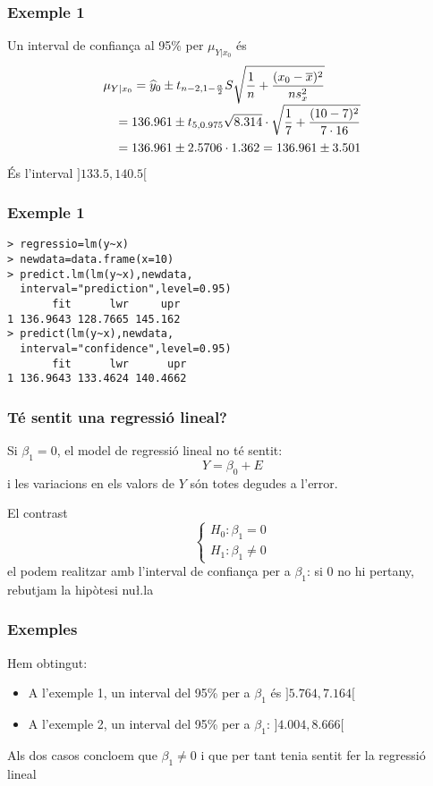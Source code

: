 \documentclass[12pt,t]{beamer}
\theoremstyle{plain}
\theoremstyle{definition}
\begin{document}
\begin{frame}
\frametitle{Exemple 1}
\vspace*{-2ex}


Un interval de confiança al 95\% per $\mu_{Y|x_0}$ és
$$
\begin{array}{l}
\displaystyle
\mu_{Y|x_0}=\widehat{y}_0\pm t_{n-2,1-\frac{\alpha}{2}} S\sqrt{\frac{1}{n}+\frac{(x_0-\overline{x})^2}{ns^2_x}}
\\[2ex]
\displaystyle\hphantom{y_0}=136.961\pm t_{5,0.975} \sqrt{8.314}\cdot\sqrt{\frac{1}{7}+\frac{(10-7)^2}{7\cdot 16 }}\\[2ex]
\hphantom{y_0} =
136.961\pm 2.5706 \cdot  1.362=136.961\pm  3.501
\end{array}
$$
És l'interval $]133.5, 140.5[$

\end{frame}


\begin{frame}[fragile]
\frametitle{Exemple 1}
\vspace*{-2ex}

\begin{verbatim}
> regressio=lm(y~x)
> newdata=data.frame(x=10)
> predict.lm(lm(y~x),newdata,
  interval="prediction",level=0.95)
       fit      lwr     upr
1 136.9643 128.7665 145.162
> predict(lm(y~x),newdata,
  interval="confidence",level=0.95)
       fit      lwr      upr
1 136.9643 133.4624 140.4662
\end{verbatim}



\end{frame}

\begin{frame}
\frametitle{Té sentit una regressió lineal?}

Si $\beta_1=0$,  el model de regressió lineal no té sentit:
$$
Y=\beta_0+E
$$
i les variacions en els valors de $Y$ són totes degudes a l'error.
\medskip

El contrast
$$
\left\{\begin{array}{l}
H_0:\beta_1=0\\
H_1:\beta_1 \neq 0
\end{array}
\right.
$$
el podem realitzar amb l'interval de confiança per a $\beta_1$: si 0 no hi pertany, 
rebutjam la hipòtesi nu\l.la
\end{frame}


\begin{frame}
\frametitle{Exemples}
\vspace*{-2ex}

Hem obtingut:
\begin{itemize}
\item A l'exemple 1, un interval del 95\% per a $\beta_1$ és $]5.764,7.164[$
\medskip

\item A l'exemple 2, un interval del 95\% per a $\beta_1$:  $]4.004,8.666[$
\end{itemize}
\medskip

Als dos casos concloem que $\beta_1\neq 0$ i que per tant tenia sentit fer la regressió lineal
\end{frame}
\end{document}
